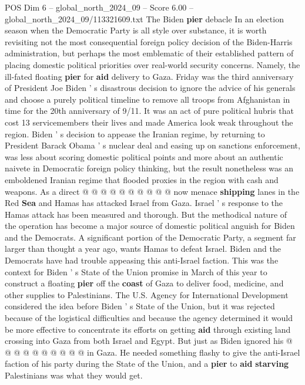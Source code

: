 \begin{textsample}{POS Dim 6 – global\_north\_2024\_09 – Score 6.00 – global\_north\_2024\_09/113321609.txt}  \label{ex:f6_pos_423}
The Biden \textbf{pier} debacle In an election season when the Democratic Party is all style over substance, it is worth revisiting not the most consequential foreign policy decision of the Biden-Harris administration, but perhaps the most emblematic of their established pattern of placing domestic political priorities over real-world security concerns.
Namely, the ill-fated floating \textbf{pier} for \textbf{aid} delivery to Gaza.
Friday was the third anniversary of President Joe Biden ' s disastrous decision to ignore the advice of his generals and choose a purely political timeline to remove all troops from Afghanistan in time for the 20th anniversary of 9/11.
It was an act of pure political hubris that cost 13 servicemembers their lives and made America look weak throughout the region.
Biden ' s decision to appease the Iranian regime, by returning to President Barack Obama ' s nuclear deal and easing up on sanctions enforcement, was less about scoring domestic political points and more about an authentic naivete in Democratic foreign policy thinking, but the result nonetheless was an emboldened Iranian regime that flooded proxies in the region with cash and weapons.
As a direct @ @ @ @ @ @ @ @ @ @ now menace \textbf{shipping} lanes in the Red \textbf{Sea} and Hamas has attacked Israel from Gaza.
Israel ' s response to the Hamas attack has been measured and thorough.
But the methodical nature of the operation has become a major source of domestic political anguish for Biden and the Democrats.
A significant portion of the Democratic Party, a segment far larger than thought a year ago, wants Hamas to defeat Israel.
Biden and the Democrats have had trouble appeasing this anti-Israel faction.
This was the context for Biden ' s State of the Union promise in March of this year to construct a floating \textbf{pier} off the \textbf{coast} of Gaza to deliver food, medicine, and other supplies to Palestinians.
The U.S.
Agency for International Development considered the idea before Biden ' s State of the Union, but it was rejected because of the logistical difficulties and because the agency determined it would be more effective to concentrate its efforts on getting \textbf{aid} through existing land crossing into Gaza from both Israel and Egypt.
But just as Biden ignored his @ @ @ @ @ @ @ @ @ @ in Gaza.
He needed something flashy to give the anti-Israel faction of his party during the State of the Union, and a \textbf{pier} to \textbf{aid} \textbf{starving} Palestinians was what they would get.

\end{textsample}
